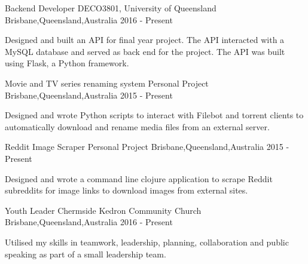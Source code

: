 


\begin{cventries}
\cventry
{Backend Developer} %
{DECO3801, University of Queensland} %
{Brisbane,Queensland,Australia} %
{2016 - Present} %
{ %
	\begin{cvitems}
		\item {Designed and built an API for final year project. The API interacted with a MySQL database and served as back end for the project. The API was built using Flask, a Python framework.}
	\end{cvitems}
}

\cventry
{Movie and TV series renaming system} %
{Personal Project} %
{Brisbane,Queensland,Australia} %
{2015 - Present} %
{ %
	\begin{cvitems}
		\item {Designed and wrote Python scripts to interact with Filebot and torrent clients to automatically download and rename media files from an external server.}
	\end{cvitems}
}


\cventry
{Reddit Image Scraper} %
{Personal Project} %
{Brisbane,Queensland,Australia} %
{2015 - Present} %
{ %
	\begin{cvitems}
		\item {Designed and wrote a command line clojure application to scrape Reddit subreddits for image links to download images from external sites.}
	\end{cvitems}
}


\cventry
{Youth Leader} %
{Chermside Kedron Community Church} %
{Brisbane,Queensland,Australia} %
{2016 - Present} %
{ %
\begin{cvitems}
\item {Utilised my skills in teamwork, leadership, planning, collaboration and public speaking as part of a small leadership team.}
\end{cvitems}
}


\end{cventries}
